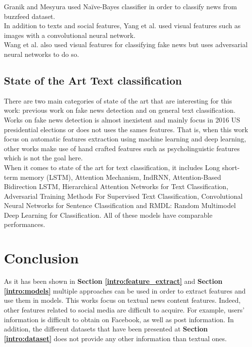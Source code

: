 Granik and Mesyura\cite{Granik2017} used Naïve-Bayes classifier in order to classify news from buzzfeed dataset.\\

In addition to texts and social features, Yang et al.\cite{Yang2018} used visual features such as images with a convolutional neural network. \\

Wang et al.\cite{Wang2018} also used visual features for classifying fake news but uses adversarial neural networks to do so. 
\subsection{State of the Art Text classification}
There are two main categories of state of the art that are interesting for this work: previous work on fake news detection and on general text classification. Works on fake news detection is almost inexistent and mainly focus in 2016 US presidential elections or does not uses the sames features. That is, when this work focus on automatic features extraction using machine learning and deep learning, other works make use of hand crafted features\cite{Reis2019,Perez-Rosas2017} such as psycholinguistic features\cite{Pennebaker2001} which is not the goal here. \\

When it comes to state of the art for text classification, it includes Long short-term memory (LSTM)\cite{Hochreiter1997LongSM}, Attention Mechanism\cite{Vaswani2017AttentionIA}, IndRNN\cite{Li2018}, Attention-Based Bidirection LSTM\cite{zhou-etal-2016-attention}, Hierarchical Attention Networks for Text Classification\cite{yang_hierarchical_2016}, Adversarial Training Methods For Supervised Text Classification\cite{miyato_adversarial_2016}, Convolutional Neural Networks for Sentence Classification\cite{kim_convolutional_2014} and RMDL: Random Multimodel Deep Learning for Classification\cite{kowsari_rmdl:_2018}. All of these models have comparable performances. 
\section{Conclusion}
As it has been shown in \textbf{Section \ref{intro:feature_extract}} and \textbf{Section \ref{intro:models}} multiple approaches can be used in order to extract features and use them in models. This works focus on textual news content features. Indeed, other features related to social media are difficult to acquire. For example, users’ information is difficult to obtain on Facebook, as well as post information. In addition, the different datasets that have been presented at \textbf{Section \ref{intro:dataset}} does not provide any other information than textual ones. \\

